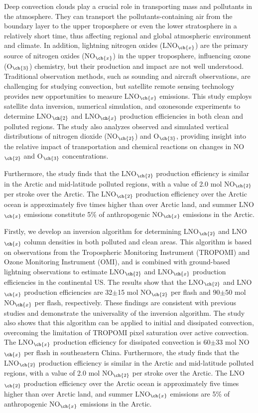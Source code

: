 {
Deep convection clouds play a crucial role in transporting mass and pollutants in the atmosphere.
They can transport the pollutants-containing air from the boundary layer to the upper troposphere or even the lower stratosphere in a relatively short time, thus affecting regional and global atmospheric environment and climate.
In addition, lightning nitrogen oxides (LNO$_{\ch{x}}$) are the primary source of nitrogen oxides (NO$_{\ch{x}}$) in the upper troposphere, influencing ozone (O$_{\ch{3}}$) chemistry, but their production and impact are not well understood.
Traditional observation methods, such as sounding and aircraft observations, are challenging for studying convection,
but satellite remote sensing technology provides new opportunities to measure LNO$_{\ch{x}}$ emissions.
This study employs satellite data inversion, numerical simulation, and ozonesonde experiments to determine LNO$_{\ch{2}}$ and LNO$_{\ch{x}}$ production efficiencies in both clean and polluted regions.
The study also analyzes observed and simulated vertical distributions of nitrogen dioxide (NO$_{\ch{2}}$) and O$_{\ch{3}}$, providing insight into the relative impact of transportation and chemical reactions on changes in NO$_{\ch{2}}$ and O$_{\ch{3}}$ concentrations.



Furthermore, the study finds that the LNO$_{\ch{2}}$ production efficiency is similar in the Arctic and mid-latitude polluted regions, with a value of 2.0 mol NO$_{\ch{2}}$ per stroke over the Arctic. The LNO$_{\ch{2}}$ production efficiency over the Arctic ocean is approximately five times higher than over Arctic land, and summer LNO$_{\ch{x}}$ emissions constitute 5\% of anthropogenic NO$_{\ch{x}}$ emissions in the Arctic.


Firstly, we develop an inversion algorithm for determining LNO$_{\ch{2}}$ and LNO$_{\ch{x}}$ column densities in both polluted and clean areas.
This algorithm is based on observations from the Tropospheric Monitoring Instrument (TROPOMI) and Ozone Monitoring Instrument (OMI), and is combined with ground-based lightning observations to estimate LNO$_{\ch{2}}$ and LNO$_{\ch{x}}$ production efficiencies in the continental US.
The results show that the LNO$_{\ch{2}}$ and LNO$_{\ch{x}}$ production efficiencies are 32$\pm$15 mol NO$_{\ch{2}}$ per flash and 90$\pm$50 mol NO$_{\ch{x}}$ per flash, respectively.
These findings are consistent with previous studies and demonstrate the universality of the inversion algorithm.
The study also shows that this algorithm can be applied to initial and dissipated convection, overcoming the limitation of TROPOMI pixel saturation over active convection.
The LNO$_{\ch{x}}$ production efficiency for dissipated convection is 60$\pm$33 mol NO$_{\ch{x}}$ per flash in southeastern China.
Furthermore, the study finds that the LNO$_{\ch{2}}$ production efficiency is similar in the Arctic and mid-latitude polluted regions, with a value of 2.0 mol NO$_{\ch{2}}$ per stroke over the Arctic.
The LNO$_{\ch{2}}$ production efficiency over the Arctic ocean is approximately five times higher than over Arctic land, and summer LNO$_{\ch{x}}$ emissions are 5\% of anthropogenic NO$_{\ch{x}}$ emissions in the Arctic.

}

